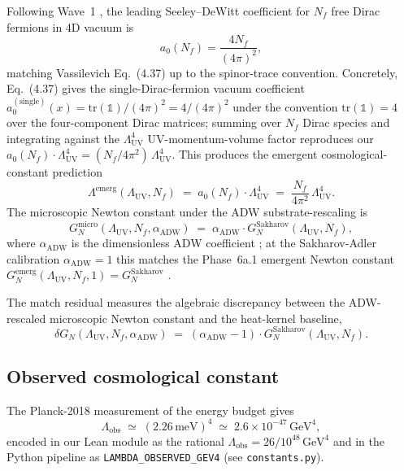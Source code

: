 \documentclass[twocolumn]{revtex4-2}
\newcommand{\Nf}{N_f}
\newcommand{\LambdaUV}{\Lambda_{\mathrm{UV}}}
\newcommand{\Lambdaemerg}{\Lambda^{\mathrm{emerg}}}
\newcommand{\Lambdaobs}{\Lambda_{\mathrm{obs}}}
\newcommand{\aADW}{\alpha_{\mathrm{ADW}}}
\newcommand{\GN}{G_{N}}
\newcommand{\GNem}{G_{N}^{\mathrm{emerg}}}
\newcommand{\GNsak}{G_{N}^{\mathrm{Sakharov}}}
\begin{document}
Following Wave~1 \cite{Roehm2026Wave1}, the leading Seeley--DeWitt
coefficient for $\Nf$ free Dirac fermions in 4D vacuum is
\begin{equation}
  a_{0}(\Nf) = \frac{4\Nf}{(4\pi)^{2}},
  \label{eq:a0}
\end{equation}
matching Vassilevich \cite{Vassilevich2003} Eq.~(4.37) up to the
spinor-trace convention. Concretely, Eq.~(4.37) gives the
single-Dirac-fermion vacuum coefficient $a_{0}^{(\mathrm{single})}(x)
= \mathrm{tr}(\mathbb{1})/(4\pi)^{2} = 4/(4\pi)^{2}$ under the
convention $\mathrm{tr}(\mathbb{1}) = 4$ over the four-component
Dirac matrices; summing over $\Nf$ Dirac species and integrating
against the $\LambdaUV^{4}$ UV-momentum-volume factor reproduces our
$a_{0}(\Nf) \cdot \LambdaUV^{4} = (\Nf/4\pi^{2})\,\LambdaUV^{4}$.
This produces the emergent
cosmological-constant prediction
\begin{equation}
  \Lambdaemerg(\LambdaUV,\Nf) \;=\; a_{0}(\Nf)\cdot\LambdaUV^{4}
  \;=\; \frac{\Nf}{4\pi^{2}}\,\LambdaUV^{4}.
  \label{eq:Lemerg}
\end{equation}
The microscopic Newton constant under the ADW substrate-rescaling is
\begin{equation}
  \GN^{\mathrm{micro}}(\LambdaUV,\Nf,\aADW)
    \;=\; \aADW \cdot \GNsak(\LambdaUV,\Nf),
  \label{eq:GNmicro}
\end{equation}
where $\aADW$ is the dimensionless ADW coefficient
\cite{Vergeles2025}; at the Sakharov-Adler calibration $\aADW=1$
this matches the Phase~6a.1 emergent Newton constant
$\GNem(\LambdaUV,\Nf,1)=\GNsak$ \cite{LinearizedEFE2026}.

The match residual measures the algebraic discrepancy between the
ADW-rescaled microscopic Newton constant and the heat-kernel
baseline,
\begin{equation}
  \delta\GN(\LambdaUV,\Nf,\aADW) \;=\;
    (\aADW - 1)\cdot \GNsak(\LambdaUV,\Nf).
  \label{eq:dGN}
\end{equation}

\subsection{Observed cosmological constant}

The Planck-2018 measurement of the energy budget gives
\cite{Planck2018}
\begin{equation}
  \Lambdaobs \;\simeq\; (2.26\,\mathrm{meV})^{4}
    \;\simeq\; 2.6\times 10^{-47}\,\mathrm{GeV}^{4},
\end{equation}
encoded in our Lean module as the rational
$\Lambdaobs = 26/10^{48}\,\mathrm{GeV}^{4}$ and in the Python pipeline
as \texttt{LAMBDA\_OBSERVED\_GEV4} (see \texttt{constants.py}).
\end{document}
